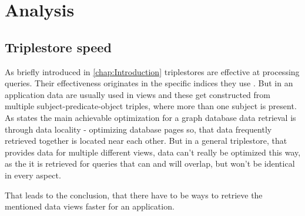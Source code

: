 \chapter{Analysis}
\label{chap:Analysis}

\section{Triplestore speed}
As briefly introduced in \autoref{chap:Introduction} triplestores are effective at processing queries. Their effectiveness originates in the specific indices they use \cite{onlineAllgeroGraphTripleIndices}. But in an application data are usually used in views and these get constructed from multiple subject-predicate-object triples, where more than one subject is present.
As \cite{onlineDbisQueryOptimizationInRdf} states the main achievable optimization for a graph database data retrieval is through data locality - optimizing database pages so, that data frequently retrieved together is located near each other. But in a general triplestore, that provides data for multiple different views, data can't really be optimized this way, as the it is retrieved for queries that can and will overlap, but won't be identical in every aspect.

That leads to the conclusion, that there have to be ways to retrieve the mentioned data views faster for an application.

